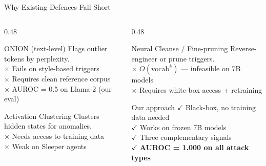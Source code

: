 \documentclass[aspectratio=169]{beamer}
\begin{document}
\begin{frame}{Why Existing Defences Fall Short}
\begin{columns}
\begin{column}{0.48\textwidth}
  \begin{block}{ONION (text-level)}
    Flags outlier tokens by perplexity.\\
    \textcolor{backdoorred}{$\times$} Fails on style-based triggers\\
    \textcolor{backdoorred}{$\times$} Requires clean reference corpus\\
    \textcolor{backdoorred}{$\times$} AUROC = 0.5 on Llama-2 (our eval)
  \end{block}
  \vspace{0.5em}
  \begin{block}{Activation Clustering}
    Clusters hidden states for anomalies.\\
    \textcolor{backdoorred}{$\times$} Needs access to training data\\
    \textcolor{backdoorred}{$\times$} Weak on Sleeper agents
  \end{block}
\end{column}
\begin{column}{0.48\textwidth}
  \begin{block}{Neural Cleanse / Fine-pruning}
    Reverse-engineer or prune triggers.\\
    \textcolor{backdoorred}{$\times$} $O(\text{vocab}^k)$ --- infeasible on 7B models\\
    \textcolor{backdoorred}{$\times$} Requires white-box access + retraining
  \end{block}
  \vspace{0.5em}
  \begin{alertblock}{Our approach}
    \textcolor{safegreen}{$\checkmark$} Black-box, no training data needed\\
    \textcolor{safegreen}{$\checkmark$} Works on frozen 7B models\\
    \textcolor{safegreen}{$\checkmark$} Three complementary signals\\
    \textcolor{safegreen}{$\checkmark$} \textbf{AUROC = 1.000 on all attack types}
  \end{alertblock}
\end{column}
\end{columns}
\end{frame}

\end{document}
